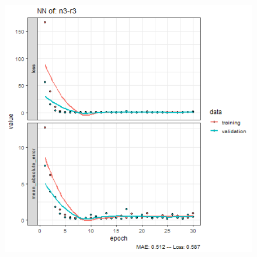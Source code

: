 \documentclass{FR16}
\begin{document}
\begin{figure}[!htb]
\begin{minipage}{0.33\textwidth}
   \end{minipage}
   \begin{minipage}{0.33\textwidth}
     \centering
     \includegraphics[width=1\linewidth]{figures/NN-n3-r3.png} 
   \end{minipage}\hfill 
\end{figure}
 \newpage
\end{document}
